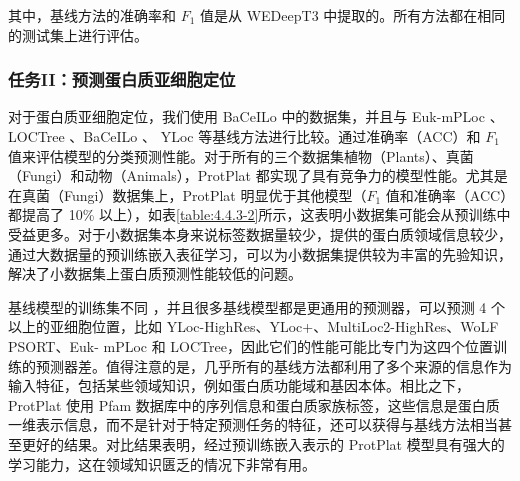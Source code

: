 \begin{table}[!htbp]
\centering
{}
 \label{table:4.4.3-1}
\end{table}
其中，基线方法的准确率和 $F_1$ 值是从 WEDeepT3 \cite{fu2019wedeept3} 中提取的。所有方法都在相同的测试集上进行评估。


\subsubsection{任务II：预测蛋白质亚细胞定位}
对于蛋白质亚细胞定位，我们使用 BaCeILo \cite{pierleoni2006bacello} 中的数据集，并且与 Euk-mPLoc \cite{cheng2018ploc}、LOCTree \cite{nair2005mimicking}、BaCeILo \cite{pierleoni2006bacello}、 YLoc \cite{2010YLoc} 等基线方法进行比较。通过准确率（ACC）和 $F_1$ 值来评估模型的分类预测性能。对于所有的三个数据集植物（Plants）、真菌（Fungi）和动物（Animals），ProtPlat 都实现了具有竞争力的模型性能。尤其是在真菌（Fungi）数据集上，ProtPlat 明显优于其他模型（$F_1$ 值和准确率（ACC）都提高了 10\% 以上），如表\ref{table:4.4.3-2}所示，这表明小数据集可能会从预训练中受益更多。对于小数据集本身来说标签数据量较少，提供的蛋白质领域信息较少，通过大数据量的预训练嵌入表征学习，可以为小数据集提供较为丰富的先验知识，解决了小数据集上蛋白质预测性能较低的问题。

基线模型的训练集不同 \cite{2010YLoc}，并且很多基线模型都是更通用的预测器，可以预测 4 个以上的亚细胞位置，比如 YLoc-HighRes、YLoc+、MultiLoc2-HighRes、WoLF PSORT、Euk- mPLoc 和 LOCTree，因此它们的性能可能比专门为这四个位置训练的预测器差。值得注意的是，几乎所有的基线方法都利用了多个来源的信息作为输入特征，包括某些领域知识，例如蛋白质功能域和基因本体。相比之下，ProtPlat 使用 Pfam 数据库中的序列信息和蛋白质家族标签，这些信息是蛋白质一维表示信息，而不是针对于特定预测任务的特征，还可以获得与基线方法相当甚至更好的结果。对比结果表明，经过预训练嵌入表示的 ProtPlat 模型具有强大的学习能力，这在领域知识匮乏的情况下非常有用。

